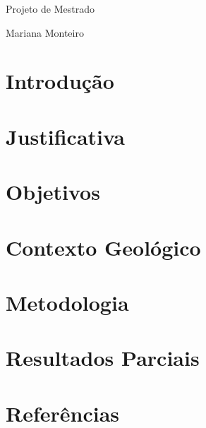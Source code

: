 \documentclass[A4,oneside]{report} %
\newcommand{\Title}{Projeto de Mestrado}
\begin{document}
\begin{titlepage}

\Title

Mariana Monteiro 

\end{titlepage}

\section{Introdução}
\label{sec:intro}

\section{Justificativa}
\label{sec:just}

\section{Objetivos}
\label{sec:objetivos}


\section{Contexto Geológico}
\label{sec:contgeo}


\section{Metodologia}
\label{sec:metodos}

\section{Resultados Parciais}
\label{sec:resparc}


\section{Referências}
\label{sec:ref}
\end{document}
